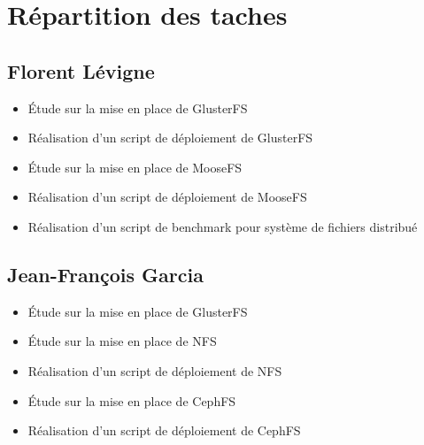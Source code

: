 \documentclass[12pt]{report}
\begin{document}
	\appendix
		\chapter{Répartition des taches}
			\section{Florent Lévigne}
				\begin{itemize}
					\item Étude sur la mise en place de GlusterFS
					\item Réalisation d'un script de déploiement de GlusterFS
					\item Étude sur la mise en place de MooseFS
					\item Réalisation d'un script de déploiement de MooseFS
					\item Réalisation d'un script de benchmark pour système de fichiers distribué
				\end{itemize}
			\section{Jean-François Garcia}
				\begin{itemize}
					\item Étude sur la mise en place de GlusterFS
					\item Étude sur la mise en place de NFS
					\item Réalisation d'un script de déploiement de NFS
					\item Étude sur la mise en place de CephFS
					\item Réalisation d'un script de déploiement de CephFS
				\end{itemize}
\end{document}
